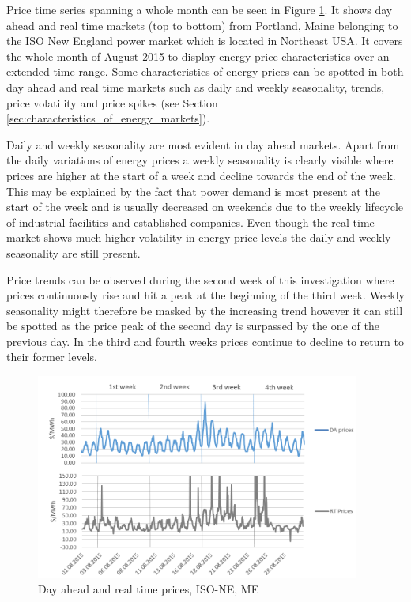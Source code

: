 Price time series spanning a whole month can be seen in Figure \ref{fig:da_rt_prices_aug_2015}. It shows day ahead and real time markets (top to bottom) from Portland, Maine belonging to the ISO New England power market which is located in Northeast USA. It covers the whole month of August 2015 to display energy price characteristics over an extended time range. 
Some characteristics of energy prices can be spotted in both day ahead and real time markets such as daily and weekly seasonality, trends, price volatility and price spikes (see Section \ref{sec:characteristics_of_energy_markets}). 

Daily and weekly seasonality are most evident in day ahead markets. Apart from the daily variations of energy prices a weekly seasonality is clearly visible where prices are higher at the start of a week and decline towards the end of the week. This may be explained by the fact that power demand is most present at the start of the week and is usually decreased on weekends due to the weekly lifecycle of industrial facilities and established companies. Even though the real time market shows much higher volatility in energy price levels the daily and weekly seasonality are still present. 

Price trends can be observed during the second week of this investigation where prices continuously rise and hit a peak at the beginning of the third week. Weekly seasonality might therefore be masked by the increasing trend however it can still be spotted as the price peak of the second day is surpassed by the one of the previous day. In the third and fourth weeks prices continue to decline to return to their former levels. 

\begin{figure}[htbp]
	\centering
		\includegraphics[width=0.95\textwidth]{figures/data_analysis/da_rt_prices_aug_2015.png}
	\caption{Day ahead and real time prices, ISO-NE, ME}
	\label{fig:da_rt_prices_aug_2015}
\end{figure}


